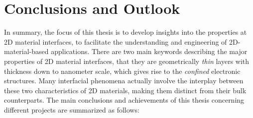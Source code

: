 \chapter{Conclusions and Outlook}
\label{ch:outlook}



\vspace{1em}

In summary, the focus of this thesis is to develop insights into the
properties at 2D material interfaces, to facilitate the understanding
and engineering of 2D-material-based applications.
%
There are two main keywords describing the major properties of 2D
material interfaces, that they are geometrically \textit{thin} layers
with thickness down to nano\-meter scale, which gives rise to the
\textit{confined} electronic structures. Many interfacial phenomena
actually involve the interplay between these two characteristics of 2D
materials, making them distinct from their bulk counterparts. The main
conclusions and achievements of this thesis concerning different
projects are summarized as follows:

